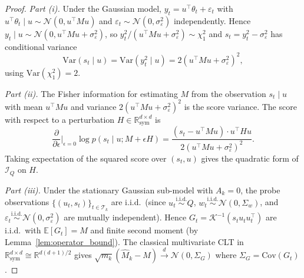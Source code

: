 \documentclass[12pt]{article}
\newcommand{\R}{\mathbb{R}}
\newcommand{\E}{\mathbb{E}}
\newcommand{\cT}{\mathcal{T}}
\newcommand{\Rsy}{\mathbb{R}^{d\times d}_{\mathrm{sym}}}
\theoremstyle{plain}
\theoremstyle{definition}
\begin{document}
\begin{proof}
\emph{Part (i).}
Under the Gaussian model, $y_t = u^\top \theta_t + \varepsilon_t$ with $u^\top\theta_t \mid u \sim \mathcal{N}(0, u^\top M u)$ and $\varepsilon_t \sim \mathcal{N}(0, \sigma_\varepsilon^2)$ independently. Hence $y_t \mid u \sim \mathcal{N}(0, u^\top M u + \sigma_\varepsilon^2)$, so $y_t^2 / (u^\top M u + \sigma_\varepsilon^2) \sim \chi^2_1$ and $s_t = y_t^2 - \sigma_\varepsilon^2$ has conditional variance
\[
\mathrm{Var}(s_t \mid u) = \mathrm{Var}(y_t^2 \mid u) = 2(u^\top M u + \sigma_\varepsilon^2)^2,
\]
using $\mathrm{Var}(\chi_1^2) = 2$.

\emph{Part (ii).}
The Fisher information for estimating $M$ from the observation $s_t \mid u$ with mean $u^\top M u$ and variance $2(u^\top M u + \sigma_\varepsilon^2)^2$ is the score variance. The score with respect to a perturbation $H \in \Rsy$ is
\[
\frac{\partial}{\partial \epsilon}\bigg|_{\epsilon=0} \log p(s_t \mid u; M + \epsilon H)
= \frac{(s_t - u^\top M u) \cdot u^\top H u}{2(u^\top M u + \sigma_\varepsilon^2)^2}.
\]
Taking expectation of the squared score over $(s_t, u)$ gives the quadratic form of $\mathcal{I}_Q$ on $H$.

\emph{Part (iii).}
Under the stationary Gaussian sub-model with $A_k = 0$, the probe observations $\{(u_t, s_t)\}_{t \in \cT_k}$ are i.i.d.\ (since $u_t \stackrel{\mathrm{i.i.d.}}{\sim} Q$, $w_t \stackrel{\mathrm{i.i.d.}}{\sim} \mathcal{N}(0, \Sigma_w)$, and $\varepsilon_t \stackrel{\mathrm{i.i.d.}}{\sim} \mathcal{N}(0, \sigma_\varepsilon^2)$ are mutually independent). Hence $G_t = \mathcal{K}^{-1}(s_t u_t u_t^\top)$ are i.i.d.\ with $\E[G_t] = M$ and finite second moment (by Lemma~\ref{lem:operator_bound}). The classical multivariate CLT in $\Rsy \cong \R^{d(d+1)/2}$ gives $\sqrt{m_k}(\widehat{M}_k - M) \xrightarrow{d} \mathcal{N}(0, \Sigma_G)$ where $\Sigma_G = \mathrm{Cov}(G_t)$.


\end{proof}
\end{document}
